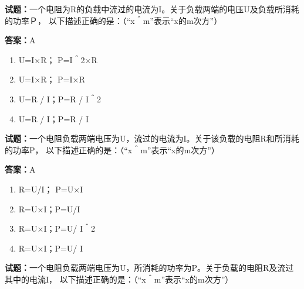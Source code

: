 \documentclass{ctexbook}
\begin{document}




\vspace{1em}

\textbf{试题：}一个电阻为R的负载中流过的电流为I。关于负载两端的电压U及负载所消耗的功率Ｐ，
以下描述正确的是：（“x＾m”表示“x的m次方”） 

\textbf{答案：}A 

\begin{enumerate}[leftmargin=3em]
  \item U=I×R； P=I＾2×R 

  \item U=I×R； P=I×R 

  \item U=R / I；P=R / I＾2 

  \item U=R / I；P=R / I 

\end{enumerate}





\vspace{1em}

\textbf{试题：}一个电阻负载两端电压为U，流过的电流为I。关于该负载的电阻R和所消耗的功率P，
以下描述正确的是：（“x＾m”表示“x的m次方”） 

\textbf{答案：}A 

\begin{enumerate}[leftmargin=3em]
  \item R=U/I； P=U×I 

  \item R=U×I；P=U/I 

  \item R=U×I；P=U/ I＾2 

  \item R=U×I；P=U/ I 

\end{enumerate}





\vspace{1em}

\textbf{试题：}一个电阻负载两端电压为U，所消耗的功率为P。关于负载的电阻R及流过其中的电流I，
以下描述正确的是：（“x＾m”表示“x的m次方”） 
\end{document}
